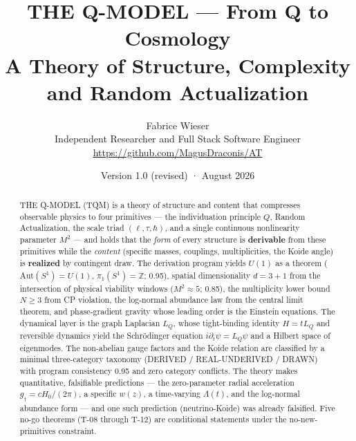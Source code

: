 \documentclass[11pt,a4paper]{article}
\title{\bfseries THE Q-MODEL — From Q to Cosmology\\[2mm]
\large A Theory of Structure, Complexity and Random Actualization}
\author{Fabrice Wieser\\[1mm]
\small Independent Researcher and Full Stack Software Engineer\\[0.5mm]
\small \url{https://github.com/MagusDraconis/AT}}
\date{Version 1.0 (revised) \quad·\quad 15 August 2026}
\begin{document}
\maketitle

\begin{center}
\end{center}

\vspace{2mm}

\begin{abstract}
\noindent
THE Q-MODEL (TQM) is a theory of structure and content that compresses observable physics
to four primitives — the individuation principle $Q$, Random Actualization, the scale
triad $(\ell,\tau,\hbar)$, and a single continuous nonlinearity parameter $M^2$ — and
holds that the \emph{form} of every structure is \textbf{derivable} from these primitives
while the \emph{content} (specific masses, couplings, multiplicities, the Koide angle) is
\textbf{realized} by contingent draw. The derivation program yields $U(1)$ as a theorem
($\mathrm{Aut}(S^1)=U(1)$, $\pi_1(S^1)=\mathbb{Z}$; 0.95), spatial dimensionality
$d=3{+}1$ from the intersection of physical viability windows ($M^2\approx5$; 0.85), the
multiplicity lower bound $N\ge3$ from CP violation, the log-normal abundance law from the
central limit theorem, and phase-gradient gravity whose leading order is the Einstein
equations. The dynamical layer is the graph Laplacian $L_Q$, whose tight-binding identity
$H=tL_Q$ and reversible dynamics yield the Schr\"odinger equation
$i\partial_t\psi=L_Q\psi$ and a Hilbert space of eigenmodes. The non-abelian gauge factors
and the Koide relation are classified by a minimal three-category taxonomy
(DERIVED / REAL-UNDERIVED / DRAWN) with program consistency 0.95 and zero category
conflicts. The theory makes quantitative, falsifiable predictions — the zero-parameter
radial acceleration $g_\dagger=cH_0/(2\pi)$, a specific $w(z)$, a time-varying
$\Lambda(t)$, and the log-normal abundance form — and one such prediction (neutrino-Koide)
was already falsified. Five no-go theorems (T-08 through T-12) are conditional statements
under the no-new-primitives constraint.
\end{abstract}
\end{document}
